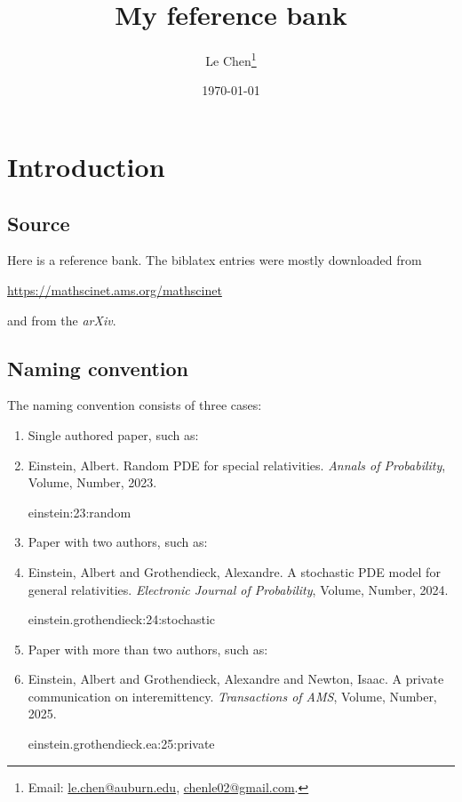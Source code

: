 \documentclass[a4paper,11pt]{article}
\title{My feference bank}
\author{Le Chen\footnote{Email: \url{le.chen@auburn.edu}, \url{chenle02@gmail.com}.}}
\date{\today}
\begin{document}
\tableofcontents

\section{Introduction}

\subsection{Source}
Here is a reference bank. The biblatex entries were mostly downloaded from

\begin{center}
  \url{https://mathscinet.ams.org/mathscinet}
\end{center}

\noindent and from the \textit{arXiv}.

\subsection{Naming convention}

The naming convention consists of three cases:
\begin{enumerate}
  \item Single authored paper, such as:
  \item[] Einstein, Albert. Random PDE for special relativities.
    \textit{Annals of Probability}, Volume, Number, 2023.
    \begin{center}
      einstein:23:random
    \end{center}
    \bigskip

  \item Paper with two authors, such as:
  \item[] Einstein, Albert and Grothendieck, Alexandre. A stochastic PDE
    model for general relativities. \textit{Electronic Journal of Probability},
    Volume, Number, 2024.
    \begin{center}
      einstein.grothendieck:24:stochastic
    \end{center}
    
  \item Paper with more than two authors, such as:
  \item[] Einstein, Albert and Grothendieck, Alexandre and Newton, Isaac.
    A private communication on interemittency. \textit{Transactions of AMS},
    Volume, Number, 2025.
    \begin{center}
      einstein.grothendieck.ea:25:private
    \end{center}
\end{enumerate}
\end{document}
